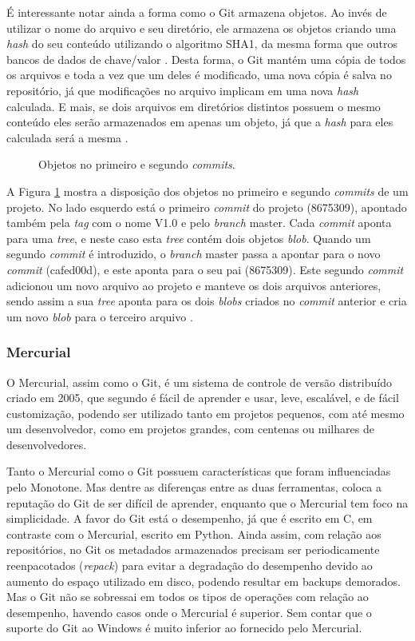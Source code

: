 \documentclass[diss]{template/setrem}
\begin{document}
É interessante notar ainda a forma como o Git armazena objetos. Ao invés de utilizar o nome do arquivo e seu diretório, ele armazena os objetos criando uma \emph{hash} do seu conteúdo utilizando o algoritmo SHA1, da mesma forma que outros bancos de dados de chave/valor \citep{Chacon2009}. Desta forma, o Git mantém uma cópia de todos os arquivos e toda a vez que um deles é modificado, uma nova cópia é salva no repositório, já que modificações no arquivo implicam em uma nova \emph{hash} calculada. E mais, se dois arquivos em diretórios distintos possuem o mesmo conteúdo eles serão armazenados em apenas um objeto, já que a \emph{hash} para eles calculada será a mesma \citep{Loeliger2009}.

\begin{figure}[!h]
    \caption{Objetos no primeiro e segundo \emph{commits}.}
    \label{fig:git-commits}
\end{figure}

A Figura \ref{fig:git-commits} mostra a disposição dos objetos no primeiro e segundo \emph{commits} de um projeto. No lado esquerdo está o primeiro \emph{commit} do projeto (8675309), apontado também pela \emph{tag} com o nome V1.0 e pelo \emph{branch} master. Cada \emph{commit} aponta para uma \emph{tree}, e neste caso esta \emph{tree} contém dois objetos \emph{blob}. Quando um segundo \emph{commit} é introduzido, o \emph{branch} master passa a apontar para o novo \emph{commit} (cafed00d), e este aponta para o seu pai (8675309). Este segundo \emph{commit} adicionou um novo arquivo ao projeto e manteve os dois arquivos anteriores, sendo assim a sua \emph{tree} aponta para os dois \emph{blobs} criados no \emph{commit} anterior e cria um novo \emph{blob} para o terceiro arquivo \citep{Loeliger2009}.

\subsubsection{Mercurial}
O Mercurial, assim como o Git, é um sistema de controle de versão distribuído criado em 2005, que segundo \citet{OSullivan2009} é fácil de aprender e usar, leve, escalável, e de fácil customização, podendo ser utilizado tanto em projetos pequenos, com até mesmo um desenvolvedor, como em projetos grandes, com centenas ou milhares de desenvolvedores.

Tanto o Mercurial como o Git possuem características que foram influenciadas pelo Monotone. Mas dentre as diferenças entre as duas ferramentas, \citet{OSullivan2009} coloca a reputação do Git de ser difícil de aprender, enquanto que o Mercurial tem foco na simplicidade. A favor do Git está o desempenho, já que é escrito em C, em contraste com o Mercurial, escrito em Python. Ainda assim, com relação aos repositórios, no Git os metadados armazenados precisam ser periodicamente reenpacotados (\emph{repack}) para evitar a degradação do desempenho devido ao aumento do espaço utilizado em disco, podendo resultar em backups demorados. Mas o Git não se sobressai em todos os tipos de operações com relação ao desempenho, havendo casos onde o Mercurial é superior. Sem contar que o suporte do Git ao Windows é muito inferior ao fornecido pelo Mercurial.
\end{document}
